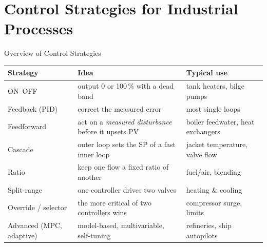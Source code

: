 \documentclass[aspectratio=169]{beamer}
\begin{document}
	\section{Control Strategies for Industrial Processes}
	\begin{frame}{Overview of Control Strategies}
		\renewcommand{\arraystretch}{1.25}
		\centering
		\small
		\begin{tabular}{@{}>{\raggedright}p{2.8cm}>{\raggedright}p{5.4cm}>{\raggedright\arraybackslash}p{4.4cm}@{}}
			\toprule
			\textbf{Strategy} & \textbf{Idea} & \textbf{Typical use} \\
			\midrule
			ON--OFF          & output 0 or 100\,\% with a dead band & tank heaters, bilge pumps \\
			Feedback (PID)   & correct the measured error            & most single loops \\
			Feedforward      & act on a \emph{measured disturbance} before it upsets PV & boiler feedwater, heat exchangers \\
			Cascade          & outer loop sets the SP of a fast inner loop & jacket temperature, valve flow \\
			Ratio            & keep one flow a fixed ratio of another & fuel/air, blending \\
			Split-range      & one controller drives two valves        & heating \& cooling \\
			Override / selector & the more critical of two controllers wins & compressor surge, limits \\
			Advanced (MPC, adaptive) & model-based, multivariable, self-tuning & refineries, ship autopilots \\
			\bottomrule
		\end{tabular}
	\end{frame}
\end{document}
